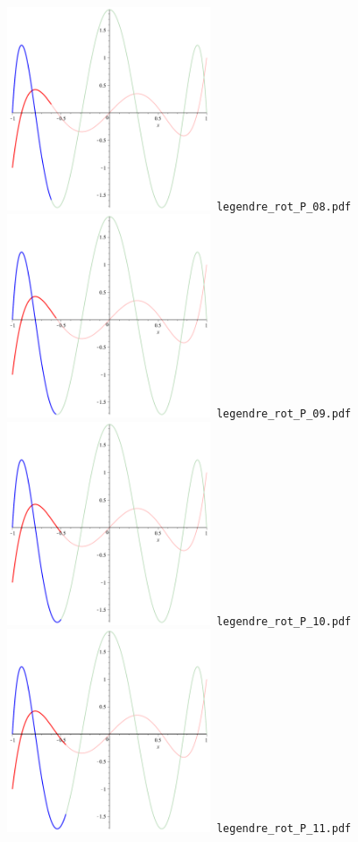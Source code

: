\documentclass[a4paper]{amsart}
\begin{document}
\includegraphics[width=6cm]{legendre_rot_P_08.pdf}\verb+ legendre_rot_P_08.pdf+\\
\includegraphics[width=6cm]{legendre_rot_P_09.pdf}\verb+ legendre_rot_P_09.pdf+\\
\includegraphics[width=6cm]{legendre_rot_P_10.pdf}\verb+ legendre_rot_P_10.pdf+\\
\includegraphics[width=6cm]{legendre_rot_P_11.pdf}\verb+ legendre_rot_P_11.pdf+\\
\end{document}

